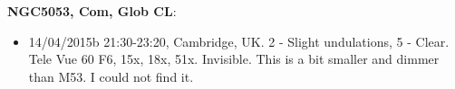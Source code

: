 {\bf NGC5053, Com, Glob CL}:
\begin{itemize}
\item 14/04/2015b 21:30-23:20, Cambridge, UK. 2 - Slight undulations, 5 - Clear. Tele Vue 60 F6, 15x, 18x, 51x. Invisible. This is a bit smaller and dimmer than M53. I could not find it.
\end{itemize}
